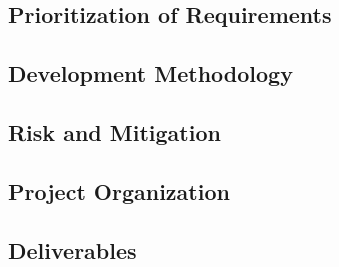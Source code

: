 \subsection{Prioritization of Requirements}

\subsection*{Development Methodology}

\subsection*{Risk and Mitigation}

\subsection{Project Organization}

\subsection{Deliverables}